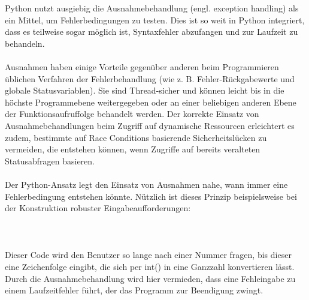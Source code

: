 Python nutzt ausgiebig die Ausnahmebehandlung (engl. exception handling) als ein Mittel, um Fehlerbedingungen zu testen. Dies ist so weit in Python integriert, dass es teilweise sogar möglich ist, Syntaxfehler abzufangen und zur Laufzeit zu behandeln.\\
\\
Ausnahmen haben einige Vorteile gegenüber anderen beim Programmieren üblichen Verfahren der Fehlerbehandlung (wie z. B. Fehler-Rückgabewerte und globale Statusvariablen). Sie sind Thread-sicher und können leicht bis in die höchste Programmebene weitergegeben oder an einer beliebigen anderen Ebene der Funktionsaufruffolge behandelt werden. Der korrekte Einsatz von Ausnahmebehandlungen beim Zugriff auf dynamische Ressourcen erleichtert es zudem, bestimmte auf Race Conditions basierende Sicherheitslücken zu vermeiden, die entstehen können, wenn Zugriffe auf bereits veralteten Statusabfragen basieren.\\
\\
Der Python-Ansatz legt den Einsatz von Ausnahmen nahe, wann immer eine Fehlerbedingung entstehen könnte. Nützlich ist dieses Prinzip beispielsweise bei der Konstruktion robuster Eingabeaufforderungen:\\
\\
\\
\\
Dieser Code wird den Benutzer so lange nach einer Nummer fragen, bis dieser eine Zeichenfolge eingibt, die sich per int() in eine Ganzzahl konvertieren lässt. Durch die Ausnahmebehandlung wird hier vermieden, dass eine Fehleingabe zu einem Laufzeitfehler führt, der das Programm zur Beendigung zwingt.
